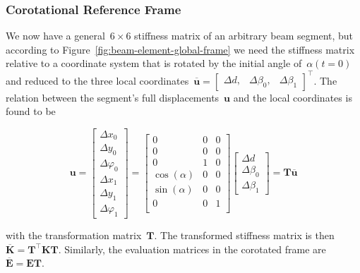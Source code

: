 
\subsubsection*{Corotational Reference Frame}

We now have a general~$6 \times 6$ stiffness matrix of an arbitrary beam segment, but according to Figure~\ref{fig:beam-element-global-frame} we need the stiffness matrix relative to a coordinate system that is rotated by the initial angle of~$\alpha(t=0)$ and reduced to the three local coordinates~$\overline{\boldsymbol{u}} = \begin{bmatrix}\Delta d, & \Delta \beta_0, & \Delta \beta_1\end{bmatrix}^\intercal$.
The relation between the segment's full displacements~$\boldsymbol{u}$ and the local coordinates is found to be

\begin{equation}
\boldsymbol{u} =
\begin{bmatrix}
\Delta x_0 \\ \Delta y_0 \\ \Delta \varphi_0 \\ \Delta x_1 \\ \Delta y_1 \\ \Delta \varphi_1
\end{bmatrix}
=
\begin{bmatrix}
0 & 0 & 0 \\
0 & 0 & 0 \\
0 & 1 & 0 \\
\cos(\alpha) & 0 & 0 \\
\sin(\alpha) & 0 & 0 \\
0 & 0 & 1 \\
\end{bmatrix}
\begin{bmatrix}
\Delta d \\ \Delta \beta_0 \\ \Delta \beta_1
\end{bmatrix}
=
\boldsymbol{T}
\overline{\boldsymbol{u}}
\end{equation}

with the transformation matrix~$\boldsymbol{T}$.
The transformed stiffness matrix is then~$\overline{\boldsymbol{K}} = \boldsymbol{T}^\intercal\boldsymbol{K}\boldsymbol{T}$.
Similarly, the evaluation matrices in the corotated frame are~$\overline{\boldsymbol{E}} = \boldsymbol{E}\boldsymbol{T}$.

